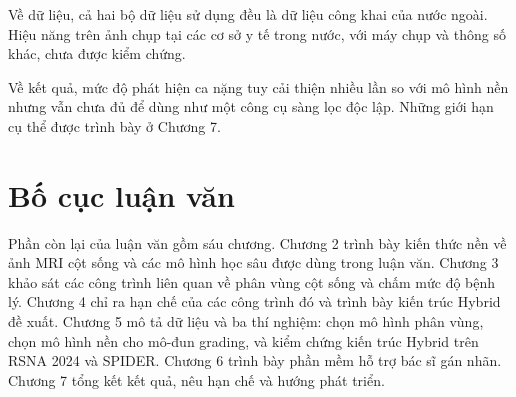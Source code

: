 Về dữ liệu, cả hai bộ dữ liệu sử dụng đều là dữ liệu công khai của nước ngoài. Hiệu năng trên ảnh chụp tại các cơ sở y tế trong nước, với máy chụp và thông số khác, chưa được kiểm chứng.

Về kết quả, mức độ phát hiện ca nặng tuy cải thiện nhiều lần so với mô hình nền nhưng vẫn chưa đủ để dùng như một công cụ sàng lọc độc lập. Những giới hạn cụ thể được trình bày ở Chương 7.

\section{Bố cục luận văn}

Phần còn lại của luận văn gồm sáu chương. Chương 2 trình bày kiến thức nền về ảnh MRI cột sống và các mô hình học sâu được dùng trong luận văn. Chương 3 khảo sát các công trình liên quan về phân vùng cột sống và chấm mức độ bệnh lý. Chương 4 chỉ ra hạn chế của các công trình đó và trình bày kiến trúc Hybrid đề xuất. Chương 5 mô tả dữ liệu và ba thí nghiệm: chọn mô hình phân vùng, chọn mô hình nền cho mô-đun grading, và kiểm chứng kiến trúc Hybrid trên RSNA 2024 và SPIDER. Chương 6 trình bày phần mềm hỗ trợ bác sĩ gán nhãn. Chương 7 tổng kết kết quả, nêu hạn chế và hướng phát triển.
